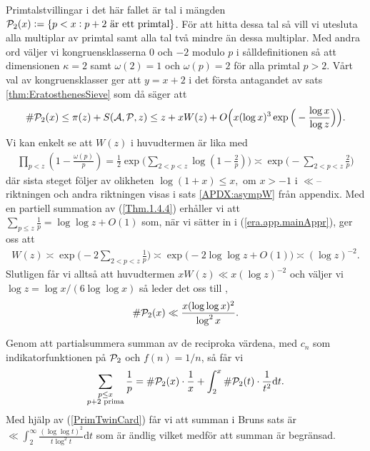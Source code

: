 Primtalstvillingar i det här fallet är tal i mängden \(\P_2(x) := \{p < x : p + 2 \text{ är ett primtal}\}\). För att hitta dessa tal så vill vi utesluta alla multiplar av primtal samt alla tal två mindre än dessa multiplar. Med andra ord väljer vi kongruensklasserna $0$ och $-2$ modulo $p$ i sålldefinitionen så att dimensionen \(\kappa = 2\) samt \(\omega(2) = 1\) och \(\omega(p) = 2\) för alla primtal $p > 2$. Vårt val av kongruensklasser ger att \(y = x + 2\) i det första antagandet av sats \ref{thm:EratosthenesSieve} som då säger att
\begin{align*}
    \card{\P_2(x)} \leq \pi(z) + \S{A}{P}{z} \leq z + x W(z) + O\Big(x (\log x)^3 \exp \Big( - \frac{\log x}{\log z} \Big) \Big).
\end{align*}
Vi kan enkelt se att \(W(z)\) i huvudtermen är lika med
\begin{align}
    \prod_{p < z}\left( 1 - \frac{\omega(p)}{p} \right) = \frac{1}{2} \exp \Bigg( \sum_{2 <p < z} \log \left( 1 - \frac{2}{p} \right) \Bigg) \asymp \exp \Bigg( - \sum_{2 <p < z} \frac{2}{p}  \Bigg) \label{era.app.mainAppr}
\end{align}
där sista steget följer av olikheten \(\log(1 + x) \leq x, \text{ om } x > -1\) i \(\ll\)--riktningen och andra riktningen visas i sats \ref{APDX:asympW} från appendix. Med en partiell summation av (\ref{Thm.1.4.4}) erhåller vi att \(\sum_{p \leq z} \frac{1}{p} = \log \log z + O(1)\) som, när vi sätter in i (\ref{era.app.mainAppr}), ger oss att
\begin{align} \label{era.app.secondMainAppr} 
    W(z) \asymp \exp \Bigg( - 2 \sum_{2 <p < z} \frac{1}{p}  \Bigg) \asymp \exp \big( -2 \log \log z + O(1)  \big) \asymp (\log z)^{-2}.
\end{align}
Slutligen får vi alltså att huvudtermen \(x W(z) \ll x (\log z)^{-2}\) och väljer vi \(\log z = \log x / (6 \log \log x)\) så leder det oss till \cite[Sats 5.4.4]{cojocarumurty}, 
\begin{align} \label{PrimTwinCard}
    \card{\P_2(x)} \ll \frac{x (\log \log x)^2}{\log^2 x} .
\end{align}

Genom att partialsummera summan av de reciproka värdena, med \(c_n\) som indikatorfunktionen på \(\P_2\) och \(f(n) = 1 / n\), så får vi 
\begin{align*}
    \sum_{\substack{p \leq x \\ p + 2 \text{ prima}}} \frac{1}{p} = \card{\P_2(x)} \cdot \frac{1}{x} + \int_2^x \card{\P_2(t)} \cdot \frac{1}{t^2} \text{d}t . 
\end{align*}
Med hjälp av (\ref{PrimTwinCard}) får vi att summan i Bruns sats är \(\ll \int_2^\infty \frac{(\log \log t)^2}{t \log^2 t} \text{d}t\) som är ändlig vilket medför att summan är begränsad. 


